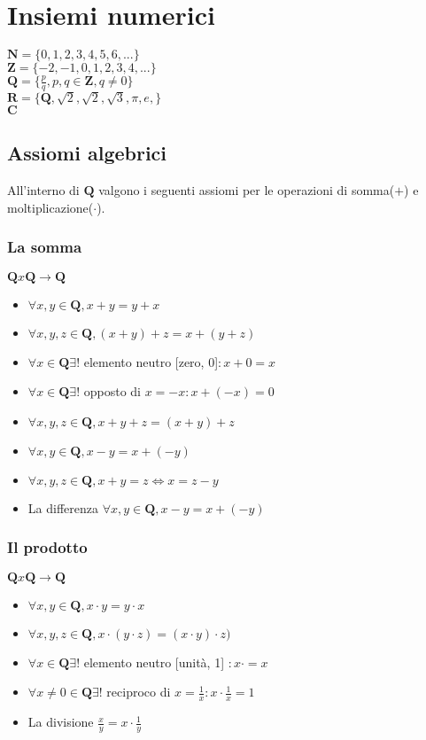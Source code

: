 \chapter{Insiemi numerici}
$\mathbf{N}=\{0, 1, 2, 3, 4, 5, 6, ... \}$\\
$\mathbf{Z}=\{ -2, -1, 0, 1, 2, 3, 4, ...\}$\\
$\mathbf{Q}=\{ \frac{p}{q}, p,q \in \mathbf{Z}, q\ne 0\}$\\
$\mathbf{R}=\{\mathbf{Q}, \sqrt{2}, \sqrt{2}, \sqrt{3}, \pi, e,\}$\\
$\mathbf{C}$
\section{Assiomi algebrici}
All'interno di $\mathbf{Q}$ valgono i seguenti assiomi per le operazioni di somma($+$) e moltiplicazione($\cdot$).\\
\subsection{La somma}
$\mathbf{Q}x\mathbf{Q}\rightarrow\mathbf{Q}$
\begin{itemize}
\item $\forall x, y \in \mathbf{Q}, x+y=y+x$
\item $\forall x, y, z \in \mathbf{Q}, (x+y)+z=x+(y+z)$
\item $\forall x\in \mathbf{Q} \exists !$ elemento neutro [zero, 0]$: x+0=x$
\item $\forall x\in \mathbf{Q} \exists !$ opposto di $x=-x : x+(-x)=0$
\item $\forall x, y, z \in \mathbf{Q}, x+y+z=(x+y)+z$
\item $\forall x, y \in \mathbf{Q}, x-y=x+(-y)$
\item $\forall x, y, z \in \mathbf{Q}, x+y=z \Leftrightarrow x=z-y$
\item La differenza $\forall x, y\in \mathbf{Q}, x-y=x+(-y)$
\end{itemize}
\subsection{Il prodotto}
$\mathbf{Q}x\mathbf{Q}\rightarrow\mathbf{Q}$
\begin{itemize}
\item $\forall x, y \in \mathbf{Q}, x\cdot y=y\cdot x$
\item $\forall x, y, z \in \mathbf{Q}, x\cdot(y\cdot z)=(x\cdot y)\cdot z)$
\item $\forall x\in \mathbf{Q} \exists !$ elemento neutro [unit\`a, 1] $: x\cdot =x $
\item $\forall x\ne 0\in \mathbf{Q} \exists !$ reciproco di $x=\frac{1}{x} : x\cdot\frac{1}{x}=1$
\item La divisione $\frac{x}{y}=x\cdot\frac{1}{y}$  
\end{itemize}
